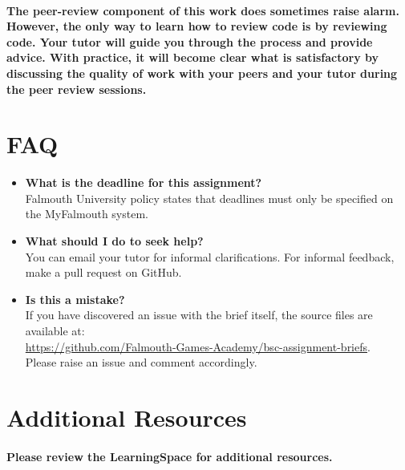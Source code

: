 \documentclass{../../fal_assignment}
\begin{document}
\paragraph{The peer-review component of this work does sometimes raise alarm. However, the only way to learn how to review code is by reviewing code. Your tutor will guide you through the process and provide advice. With practice, it will become clear what is satisfactory by discussing the quality of work with your peers and your tutor during the peer review sessions.} 

\section*{FAQ}

\begin{itemize}
	\item 	\textbf{What is the deadline for this assignment?} \\ 
    		Falmouth University policy states that deadlines must only be specified on the MyFalmouth system.
    		
	\item 	\textbf{What should I do to seek help?} \\ 
    		You can email your tutor for informal clarifications. For informal feedback, make a pull request on GitHub. 
    		
    	\item 	\textbf{Is this a mistake?} \\ 	
    		If you have discovered an issue with the brief itself, the source files are available at: \\
    		\url{https://github.com/Falmouth-Games-Academy/bsc-assignment-briefs}.\\
    		 Please raise an issue and comment accordingly.
\end{itemize}

\section*{Additional Resources}

\paragraph{Please review the LearningSpace for additional resources.}

\end{document}
